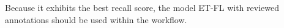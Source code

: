 Because it exhibits the best recall score, the model ET-FL with reviewed annotations should be used within the workflow.

\begin{figure}
	\center
\end{figure}
